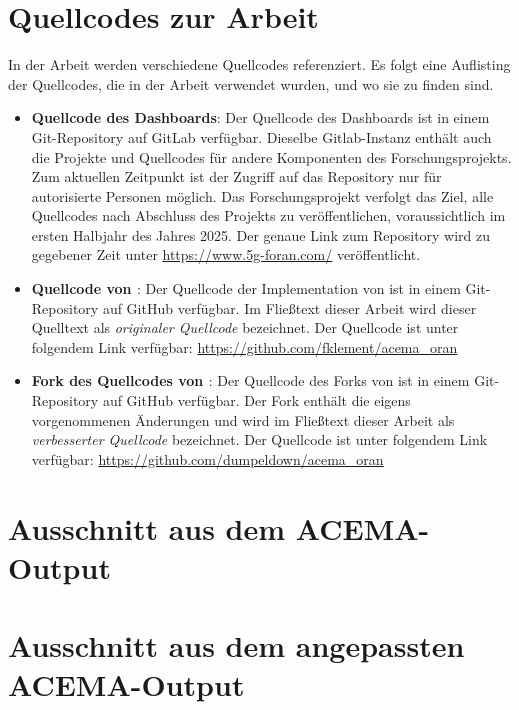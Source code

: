 \chapter{Quellcodes zur Arbeit}
\label{app:sourcecode}
In der Arbeit werden verschiedene Quellcodes referenziert. Es folgt eine Auflisting der Quellcodes, die in der Arbeit verwendet wurden, und wo sie zu finden sind.
\begin{itemize}
    \item \textbf{Quellcode des Dashboards}: Der Quellcode des Dashboards ist in einem Git-Repository auf GitLab verfügbar. Dieselbe Gitlab-Instanz enthält auch die Projekte und Quellcodes für andere Komponenten des Forschungsprojekts. Zum aktuellen Zeitpunkt ist der Zugriff auf das Repository nur für autorisierte Personen möglich. Das Forschungsprojekt verfolgt das Ziel, alle Quellcodes nach Abschluss des Projekts zu veröffentlichen, voraussichtlich im ersten Halbjahr des Jahres 2025. Der genaue Link zum Repository wird zu gegebener Zeit unter \url{https://www.5g-foran.com/} veröffentlicht.
    \item \textbf{Quellcode von \citeauthor{klementSecuring6GTransition2024}}: Der Quellcode der Implementation von \citeauthor{klementSecuring6GTransition2024} ist in einem Git-Repository auf GitHub verfügbar. Im Fließtext dieser Arbeit wird dieser Quelltext als \textit{originaler Quellcode} bezeichnet. Der Quellcode ist unter folgendem Link verfügbar: \url{https://github.com/fklement/acema_oran}
    \item \textbf{Fork des Quellcodes von \citeauthor{klementSecuring6GTransition2024}}: Der Quellcode des Forks von \citeauthor{klementSecuring6GTransition2024} ist in einem Git-Repository auf GitHub verfügbar. Der Fork enthält die eigens vorgenommenen Änderungen und wird im Fließtext dieser Arbeit als \textit{verbesserter Quellcode} bezeichnet. Der Quellcode ist unter folgendem Link verfügbar: \url{https://github.com/dumpeldown/acema_oran}
\end{itemize}


\chapter{Ausschnitt aus dem ACEMA-Output}
\label{app:acema-output}

\restoregeometry
\chapter{Ausschnitt aus dem angepassten ACEMA-Output}
\label{app:acema-output-small}

\restoregeometry

